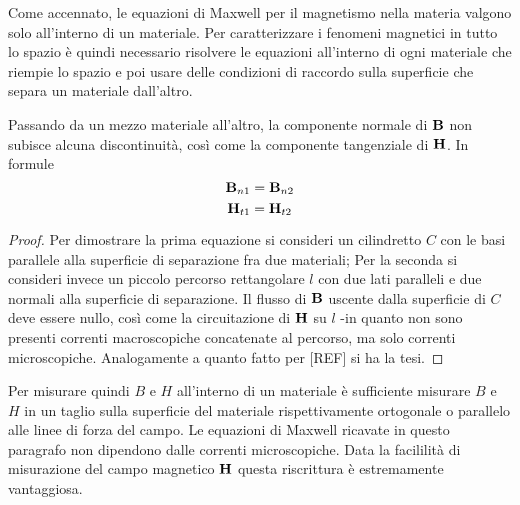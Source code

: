 Come accennato, le equazioni di Maxwell per il magnetismo nella materia valgono solo
all'interno di un materiale. Per caratterizzare i fenomeni magnetici in tutto lo spazio
è quindi necessario risolvere le equazioni all'interno di ogni materiale che riempie
lo spazio e poi usare delle condizioni di raccordo sulla superficie che separa un
materiale dall'altro.
\begin{thm}
    Passando da un mezzo materiale all'altro, la componente normale di $\vb{B}$ non subisce
    alcuna discontinuità, così come la componente tangenziale di $\vb{H}$. In formule
    \[
        \vb{B}_{n1}=\vb{B}_{n2}
    \]
    \[
        \vb{H}_{t1}=\vb{H}_{t2}
    \]
\label{teo:condizioni_raccordo_campomagnetico}
\end{thm}
\begin{proof}
    Per dimostrare la prima equazione si consideri un cilindretto $C$ con le basi parallele alla
    superficie di separazione fra due materiali; Per la seconda si consideri invece un piccolo
    percorso rettangolare $l$ con due lati paralleli e due normali alla superficie di separazione.
    Il flusso di $\vb{B}$ uscente dalla superficie di $C$ deve essere nullo, così come la circuitazione
    di $\vb{H}$ su $l$ -in quanto non sono presenti correnti macroscopiche concatenate al percorso, ma solo correnti
    microscopiche. Analogamente a quanto fatto per [REF] si ha la tesi.
\end{proof}
Per misurare quindi $B$ e $H$ all'interno di un materiale è sufficiente misurare $B$ e $H$ in un taglio
sulla superficie del materiale rispettivamente ortogonale o parallelo alle linee di forza del campo.
Le equazioni di Maxwell ricavate in questo paragrafo  non dipendono dalle correnti microscopiche. Data la
facililità  di misurazione del campo magnetico $\vb{H}$ questa riscrittura è estremamente vantaggiosa.
